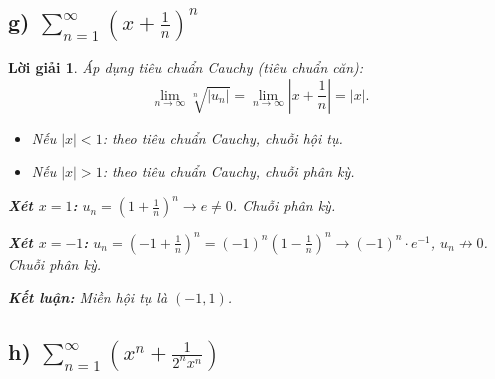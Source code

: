 \documentclass[12pt,a4paper]{article}
\newtheorem*{solution}{Lời giải}
\begin{document}
\subsection*{g) $\displaystyle\sum_{n=1}^{\infty}\left(x+\frac{1}{n}\right)^{n}$}

\begin{solution}
Áp dụng tiêu chuẩn Cauchy (tiêu chuẩn căn):
\[
\lim_{n\to\infty} \sqrt[n]{|u_n|} = \lim_{n\to\infty} \left|x + \frac{1}{n}\right| = |x|.
\]

\begin{itemize}
    \item Nếu $|x| < 1$: theo tiêu chuẩn Cauchy, chuỗi hội tụ.
    \item Nếu $|x| > 1$: theo tiêu chuẩn Cauchy, chuỗi phân kỳ.
\end{itemize}

\textbf{Xét $x = 1$:} $u_n = \left(1 + \frac{1}{n}\right)^n \to e \neq 0$. Chuỗi phân kỳ.

\textbf{Xét $x = -1$:} $u_n = \left(-1 + \frac{1}{n}\right)^n = (-1)^n\left(1 - \frac{1}{n}\right)^n \to (-1)^n \cdot e^{-1}$, $u_n \not\to 0$. Chuỗi phân kỳ.

\textbf{Kết luận:} Miền hội tụ là $\boxed{(-1, 1)}$.
\end{solution}

\subsection*{h) $\displaystyle\sum_{n=1}^{\infty}\left(x^{n}+\frac{1}{2^{n}x^{n}}\right)$}
\end{document}

